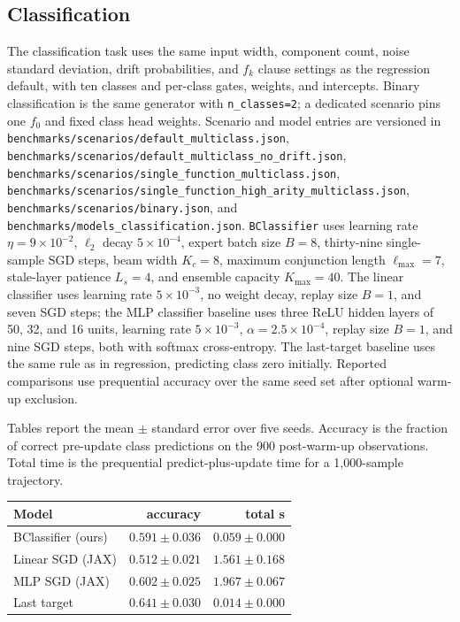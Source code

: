 \documentclass[11pt]{article}
\begin{document}
\subsection{Classification}
The classification task uses the same input width, component count, noise
standard deviation, drift probabilities, and $f_k$ clause settings as the
regression default, with ten classes and per-class gates, weights, and
intercepts.  Binary classification is the same generator with
\texttt{n\_classes=2}; a dedicated scenario pins one $f_0$ and fixed
class head weights.  Scenario and model entries are versioned in
\texttt{benchmarks/scenarios/default\_multiclass.json},
\texttt{benchmarks/scenarios/default\_multiclass\_no\_drift.json},
\texttt{benchmarks/scenarios/single\_function\_multiclass.json},
\texttt{benchmarks/scenarios/single\_function\_high\_arity\_multiclass.json},
\texttt{benchmarks/scenarios/binary.json}, and
\texttt{benchmarks/models\_classification.json}.  \texttt{BClassifier} uses
learning rate $\eta=9\times10^{-2}$, $\ell_2$ decay $5\times10^{-4}$,
expert batch size $B=8$, thirty-nine single-sample SGD steps, beam width
$K_c=8$, maximum conjunction length $\ell_{\max}=7$, stale-layer patience
$L_s=4$, and ensemble capacity $K_{\max}=40$.  The linear classifier uses
learning rate $5\times10^{-3}$, no weight decay, replay size $B=1$, and seven SGD steps; the MLP classifier
baseline uses three ReLU hidden layers of 50, 32, and 16 units, learning rate
$5\times10^{-3}$, $\alpha=2.5\times10^{-4}$, replay size $B=1$, and nine SGD steps, both with
softmax cross-entropy.  The last-target baseline uses the same rule as in
regression, predicting class zero initially.  Reported
comparisons use prequential accuracy over the same seed set after optional
warm-up exclusion.

Tables report the mean $\pm$ standard error over five seeds.  Accuracy is the
fraction of correct pre-update class predictions on the 900 post-warm-up
observations.  Total time is the prequential predict-plus-update time for a
1,000-sample trajectory.

\begin{center}
\footnotesize
\begin{tabular}{lrr}
\hline
\textbf{Model} & accuracy & total s \\
\hline
BClassifier (ours) & $0.591\pm0.036$ & $0.059\pm0.000$ \\
Linear SGD (JAX) & $0.512\pm0.021$ & $1.561\pm0.168$ \\
MLP SGD (JAX) & $0.602\pm0.025$ & $1.967\pm0.067$ \\
Last target & $0.641\pm0.030$ & $0.014\pm0.000$ \\
\hline
\end{tabular}
\end{center}
\end{document}
